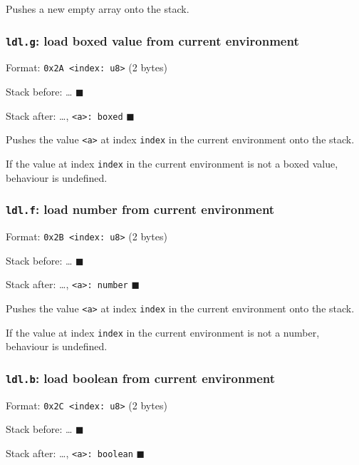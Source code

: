 Pushes a new empty array onto the stack.

\subsubsection{\texorpdfstring{\texttt{ldl.g}: load boxed value from
current environment}{ldl.g: load boxed value from current environment}}

Format: \texttt{0x2A\ \textless{}index:\ u8\textgreater{}} (2 bytes)

Stack before: \ldots{} \(\blacksquare\)

Stack after: \ldots, \texttt{\textless{}a\textgreater{}:\ boxed}
\(\blacksquare\)

Pushes the value \texttt{\textless{}a\textgreater{}} at index
\texttt{index} in the current environment onto the stack.

If the value at index \texttt{index} in the current environment is not a
boxed value, behaviour is undefined.

\subsubsection{\texorpdfstring{\texttt{ldl.f}: load number from current
environment}{ldl.f: load number from current environment}}

Format: \texttt{0x2B\ \textless{}index:\ u8\textgreater{}} (2 bytes)

Stack before: \ldots{} \(\blacksquare\)

Stack after: \ldots, \texttt{\textless{}a\textgreater{}:\ number}
\(\blacksquare\)

Pushes the value \texttt{\textless{}a\textgreater{}} at index
\texttt{index} in the current environment onto the stack.

If the value at index \texttt{index} in the current environment is not a
number, behaviour is undefined.

\subsubsection{\texorpdfstring{\texttt{ldl.b}: load boolean from current
environment}{ldl.b: load boolean from current environment}}

Format: \texttt{0x2C\ \textless{}index:\ u8\textgreater{}} (2 bytes)

Stack before: \ldots{} \(\blacksquare\)

Stack after: \ldots, \texttt{\textless{}a\textgreater{}:\ boolean}
\(\blacksquare\)

